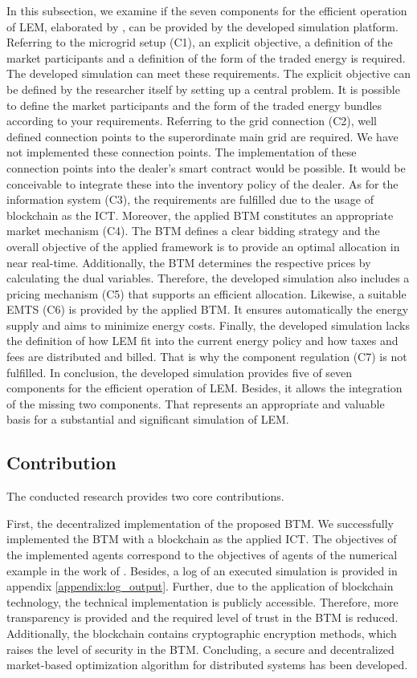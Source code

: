 In this subsection, we examine if the seven components for the efficient operation of LEM,
 elaborated by , can be 
provided by the developed simulation platform.
Referring to the microgrid setup (C1), an explicit objective, a definition of the market participants and a definition of the form of the traded energy is required. The developed simulation can meet these requirements. The explicit objective can be defined by the researcher itself by setting up a central problem. It is possible to define the market participants and the form of the traded energy bundles
according to your requirements.
Referring to the grid connection (C2), well defined connection points to the superordinate main grid are required.
We have not implemented these connection points. 
The implementation of these connection points into the dealer's smart contract would be possible. 
It would be conceivable to integrate these into the inventory policy of the dealer.
As for the information system (C3), the requirements are fulfilled due to the usage of blockchain as the ICT.
Moreover, the applied BTM constitutes an appropriate market mechanism (C4). The BTM defines a clear bidding strategy and the overall objective of the applied framework is to provide an optimal allocation in near real-time. 
Additionally, the BTM determines the respective prices by calculating the dual variables.
Therefore, the developed simulation also includes a pricing mechanism (C5) that supports an efficient allocation.
Likewise, a suitable EMTS (C6) is provided by the applied BTM. 
It ensures automatically the energy supply and aims to minimize energy costs.
Finally, the developed simulation lacks the definition of how LEM fit into the current energy policy and how taxes and fees are distributed and billed. 
That is why the component regulation (C7) is not fulfilled. 
In conclusion, the developed simulation provides five of seven components for the efficient operation of LEM. 
Besides, it allows the integration of the missing two components.
That represents an appropriate and valuable basis for a substantial and significant simulation of LEM. 

\subsection{Contribution}
The conducted research provides two core contributions.

First, the decentralized implementation of the proposed BTM. 
We successfully implemented the BTM with a blockchain as the applied ICT. 
The objectives of the implemented agents correspond to the 
objectives of agents of the numerical example in the work of .
Besides, a log of an executed simulation is provided in appendix \ref{appendix:log_output}.
Further, due to the application of blockchain technology, the technical implementation
is publicly accessible.
Therefore, more transparency is provided and the required level of trust in the BTM
is reduced. Additionally, the blockchain contains cryptographic encryption methods,
which raises the level of security in the BTM.
Concluding, a secure and decentralized market-based optimization algorithm for distributed systems has 
been developed.

